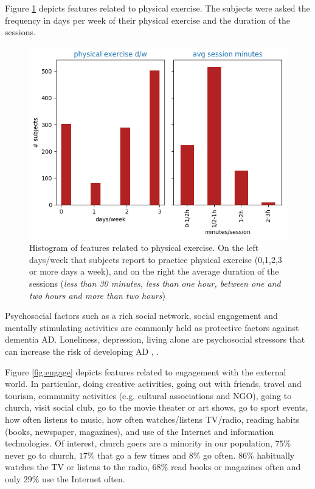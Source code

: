 \documentclass[11pt]{article}
\theoremstyle{definition}
\theoremstyle{remark}
\begin{document}
Figure \ref{fig:phys} depicts features related to physical exercise. The subjects were asked the frequency in days per week of their physical exercise and the duration of the sessions.
\begin{figure}[H]
        \centering
        \includegraphics[keepaspectratio, width=0.6\linewidth]{figures/Fig_phys}
        \caption{Histogram of features related to physical exercise. On the left days/week that subjects report to practice physical exercise (0,1,2,3 or more days a week), and on the right the average duration of the sessions (\emph{less than 30 minutes, less than one hour, between one and two hours and more than two hours})} 
        \label{fig:phys}
\end{figure}


Psychosocial factors such as a rich social network, social engagement and mentally stimulating activities are commonly held as protective factors against dementia AD. Loneliness, depression, living alone are psychosocial stressors that can increase the risk of developing AD \cite{johansson2013common}, \cite{sindi2015advances}. 

Figure \ref{fig:engage} depicts features related to engagement with the external world. In particular, doing creative activities, going out with friends, travel and tourism, community activities (e.g. cultural associations and NGO), going to church, visit social club, go to the movie theater or art shows, go to sport events, how often listens to music, how often watches/listens TV/radio, reading habits (books, newspaper, magazines), and use of the Internet and information technologies.
Of interest, church goers are a minority in our population, $75\%$ never go to church, $17\%$ that go a few times and $8\%$ go often. $86\%$ habitually watches the TV or listens to the radio, $68\%$ read books or magazines often and only $29\%$ use the Internet often.
\end{document}
